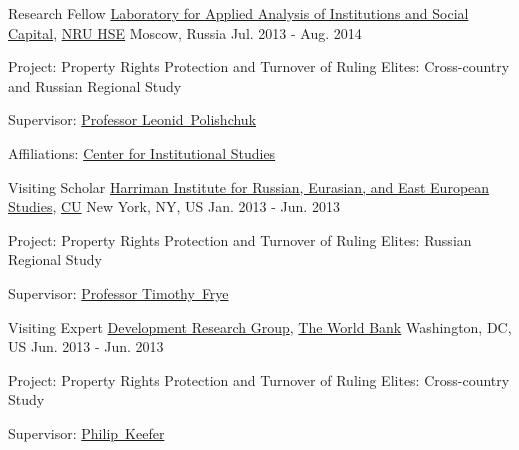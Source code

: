 

\begin{cventries}

  \cventry
    {Research Fellow} %
    {\href{http://isc.hse.ru/about_eng}{Laboratory for Applied Analysis of Institutions and Social Capital}, \href{http://www.hse.ru/en/}{NRU HSE}} %
    {Moscow, Russia} %
    {Jul. 2013 - Aug. 2014} %
    {
      \begin{cvitems} %
        \item {Project: Property Rights Protection and Turnover of Ruling Elites: Cross-country and Russian Regional Study}
        \item {Supervisor: \href{http://www.hse.ru/en/org/persons/65104}{Professor Leonid~Polishchuk}}
        \item {Affiliations: \href{http://cinst.hse.ru/en/}{Center for Institutional Studies}}
      \end{cvitems}
    }

  \cventry
    {Visiting Scholar} %
    {\href{http://harriman.columbia.edu/}{Harriman Institute for Russian, Eurasian, and East European Studies}, \href{http://columbia.edu/}{CU}} %
    {New York, NY, US} %
    {Jan. 2013 - Jun. 2013} %
    {
      \begin{cvitems} %
        \item {Project: Property Rights Protection and Turnover of Ruling Elites: Russian Regional Study}
        \item {Supervisor: \href{http://www.columbia.edu/~tmf2/}{Professor Timothy~Frye}}
      \end{cvitems}
    }

  \cventry
    {Visiting Expert} %
    {\href{http://econ.worldbank.org/external/default/main?menuPK=469435&pagePK=64165236&piPK=64165141&theSitePK=469382}{Development Research Group}, \href{http://www.worldbank.org/}{The World Bank}} %
    {Washington, DC, US} %
    {Jun. 2013 - Jun. 2013} %
    {
      \begin{cvitems} %
        \item {Project:  Property Rights Protection and Turnover of Ruling Elites: Cross-country Study}
        \item {Supervisor: \href{http://www.worldbank.org/en/about/people/philip-keefer}{Philip~Keefer}}
      \end{cvitems}
    }


\end{cventries}

